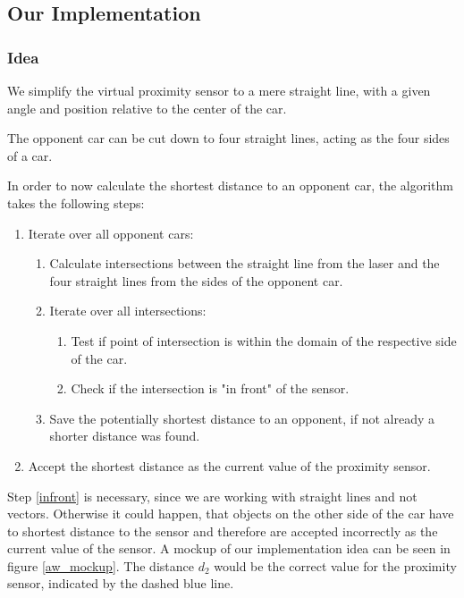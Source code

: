 \documentclass[paper=a4, fontsize=11pt]{scrreprt}
\begin{document}
\subsection{Our Implementation}
\subsubsection{Idea}
We simplify the virtual proximity sensor to a mere straight line,
with a given angle and position relative to the center of the car.

The opponent car can be cut down to four straight lines,
acting as the four sides of a car.

In order to now calculate the shortest distance to an opponent car,
the algorithm takes the following steps:

\begin{enumerate}
  \item Iterate over all opponent cars:
  \begin{enumerate}
    \item Calculate intersections between the straight line from the laser
    and the four straight lines from the sides of the opponent car.
    \item Iterate over all intersections:
    \begin{enumerate}
      \item Test if point of intersection is within the domain of the respective side of the car.
      \item\label{infront} Check if the intersection is "in front" of the sensor.
    \end{enumerate}
    \item Save the potentially shortest distance to an opponent, if not already a shorter distance was found.
  \end{enumerate}
  \item Accept the shortest distance as the current value of the proximity sensor.
\end{enumerate}

Step \ref{infront} is necessary, since we are working with straight lines
and not vectors. Otherwise it could happen,
that objects on the other side of the car have to shortest distance to the sensor
and therefore are accepted incorrectly as the current value of the sensor.
A mockup of our implementation idea can be seen in figure \ref{aw_mockup}.
The distance $d_2$ would be the correct value for the proximity sensor,
indicated by the dashed blue line.
\end{document}
